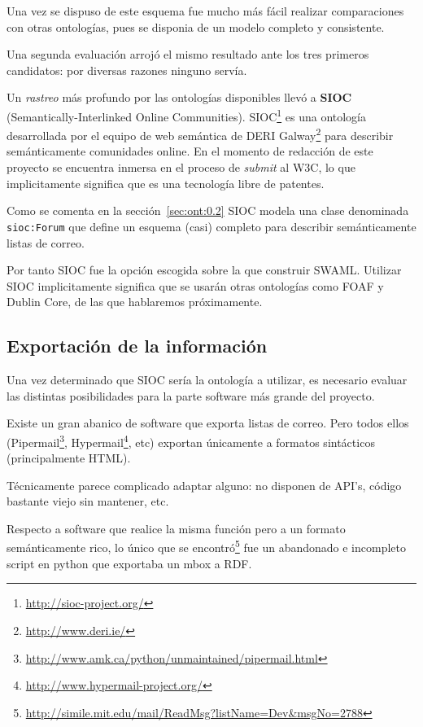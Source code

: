 Una vez se dispuso de este esquema fue mucho más fácil realizar comparaciones
con otras ontologías, pues se disponia de un modelo completo y consistente.

Una segunda evaluación arrojó el mismo resultado ante los tres primeros candidatos:
por diversas razones ninguno servía.

Un \emph{rastreo} más profundo por las ontologías disponibles llevó a 
\textbf{SIOC}\cite{Breslin2005} (Semantically-Interlinked Online Communities). 
SIOC\footnote{\url{http://sioc-project.org/}} es una ontología desarrollada 
por el equipo de web semántica de DERI Galway\footnote{\url{http://www.deri.ie/}} 
para describir semánticamente comunidades online. En el momento de redacción
de este proyecto se encuentra inmersa en el proceso de \emph{submit} al
W3C, lo que implicitamente significa que es una tecnología libre de patentes.

Como se comenta en la sección~\ref{sec:ont:0.2} SIOC modela una clase denominada
\texttt{sioc:Forum} que define un esquema (casi) completo para describir
semánticamente listas de correo.

Por tanto SIOC fue la opción escogida sobre la que construir SWAML. Utilizar SIOC
implicitamente significa que se usarán otras ontologías como FOAF y Dublin Core,
de las que hablaremos próximamente.


\subsection{Exportación de la información}

Una vez determinado que SIOC sería la ontología a utilizar, es necesario evaluar
las distintas posibilidades para la parte software más grande del proyecto.

Existe un gran abanico de software que exporta listas de correo. Pero todos
ellos (Pipermail\footnote{\url{http://www.amk.ca/python/unmaintained/pipermail.html}},
Hypermail\footnote{\url{http://www.hypermail-project.org/}}, etc) exportan únicamente
a formatos sintácticos (principalmente HTML).

Técnicamente parece complicado adaptar alguno: no disponen de API's, código bastante
viejo sin mantener, etc.

Respecto a software que realice la misma función pero a un formato semánticamente 
rico, lo único que se encontró\footnote{\url{http://simile.mit.edu/mail/ReadMsg?listName=Dev&msgNo=2788}} 
fue un abandonado e incompleto script en python que exportaba un mbox a RDF.

